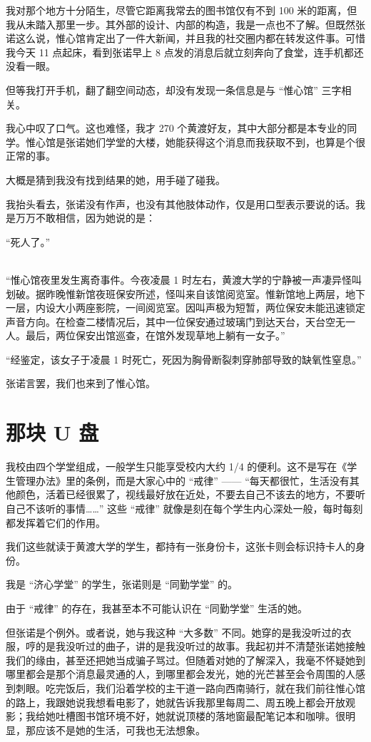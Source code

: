 \documentclass[UTF8]{ctexart}
\begin{document}
我对那个地方十分陌生，尽管它距离我常去的图书馆仅有不到 100 米的距离，但我从未踏入那里一步。其外部的设计、内部的构造，我是一点也不了解。但既然张诺这么说，惟心馆肯定出了一件大新闻，并且我的社交圈内都在转发这件事。可惜我今天 11 点起床，看到张诺早上 8 点发的消息后就立刻奔向了食堂，连手机都还没看一眼。

但等我打开手机，翻了翻空间动态，却没有发现一条信息是与 “惟心馆” 三字相关。

我心中叹了口气。这也难怪，我才 270 个黄渡好友，其中大部分都是本专业的同学。惟心馆是张诺她们学堂的大楼，她能获得这个消息而我获取不到，也算是个很正常的事。

大概是猜到我没有找到结果的她，用手碰了碰我。

我抬头看去，张诺没有作声，也没有其他肢体动作，仅是用口型表示要说的话。我是万万不敢相信，因为她说的是：

“死人了。”

~\\

“惟心馆夜里发生离奇事件。今夜凌晨 1 时左右，黄渡大学的宁静被一声凄异怪叫划破。据昨晚惟新馆夜班保安所述，怪叫来自该馆阅览室。惟新馆地上两层，地下一层，内设大小两座影院，一间阅览室。因叫声极为短暂，两位保安未能迅速锁定声音方向。在检查二楼情况后，其中一位保安通过玻璃门到达天台，天台空无一人。最后，两位保安出馆巡查，在馆外发现草地上躺有一女子。”

“经鉴定，该女子于凌晨 1 时死亡，死因为胸骨断裂刺穿肺部导致的缺氧性窒息。”

张诺言罢，我们也来到了惟心馆。

\section{那块 U 盘}

我校由四个学堂组成，一般学生只能享受校内大约 1/4 的便利。这不是写在《学生管理办法》里的条例，而是大家心中的 “戒律” —— “每天都很忙，生活没有其他颜色，活着已经很累了，视线最好放在近处，不要去自己不该去的地方，不要听自己不该听的事情……” 这些 “戒律” 就像是刻在每个学生内心深处一般，每时每刻都发挥着它们的作用。

我们这些就读于黄渡大学的学生，都持有一张身份卡，这张卡则会标识持卡人的身份。

我是 “济心学堂” 的学生，张诺则是 “同勤学堂” 的。

由于 “戒律” 的存在，我甚至本不可能认识在 “同勤学堂” 生活的她。

但张诺是个例外。或者说，她与我这种 “大多数” 不同。她穿的是我没听过的衣服，哼的是我没听过的曲子，讲的是我没听过的故事。我起初并不清楚张诺她接触我们的缘由，甚至还把她当成骗子骂过。但随着对她的了解深入，我毫不怀疑她到哪里都会是那个消息最灵通的人，到哪里都会发光，她的光芒甚至会令周围的人感到刺眼。吃完饭后，我们沿着学校的主干道一路向西南骑行，就在我们前往惟心馆的路上，我跟她说我想看电影了，她就告诉我那里每周二、周五晚上都会开放观影；我给她吐槽图书馆环境不好，她就说顶楼的落地窗最配笔记本和咖啡。很明显，那应该不是她的生活，可我也无法想象。
\end{document}
